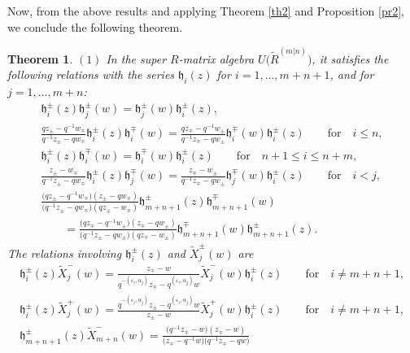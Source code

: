 \documentclass[10pt,a4paper]{amsart}
\numberwithin{equation}{section}
\newtheorem{Theorem}{Theorem}[section]
\begin{document}
Now, from the above results and applying Theorem \ref{th2} and Proposition \ref{pr2}, we conclude the following theorem.
\begin{Theorem}\label{th3}
$(1)$ In the super $R$-matrix algebra $U\bigl(\widetilde{R}^{(m|n)}\bigr)$, it satisfies the following relations with the series $\mathfrak{h}_i(z)$ for $i=1,\dots,m+n+1$, and  for $j=1,\dots,m+n$:
\begin{gather*}%
 \mathfrak{h}_i^{\pm}(z)\mathfrak{h}_j^{\pm}(w)=\mathfrak{h}_j^{\pm}(w)\mathfrak{h}_i^{\pm}(z), \\
 \frac{qz_{\pm}-q^{-1}w_{\mp}}{q^{-1}z_{\pm}-qw_{\mp}}\mathfrak{h}_i^{\pm}(z)\mathfrak{h}_i^{\mp}(w)
 =\frac{qz_{\mp}-q^{-1}w_{\pm}}{q^{-1}z_{\mp}-qw_{\pm}}\mathfrak{h}_i^{\mp}(w)\mathfrak{h}_i^{\pm}(z)\qquad
 \text{for} \quad i\leq n,\\
 \mathfrak{h}_i^{\pm}(z)\mathfrak{h}_i^{\mp}(w)=\mathfrak{h}_i^{\mp}(w)\mathfrak{h}_i^{\pm}(z)\qquad
 \text{for} \quad n+1\leq i\leq n+m,\\
 \frac{z_{\pm}-w_{\mp}}{q^{-1}z_{\pm}-qw_{\mp}}\mathfrak{h}_i^{\pm}(z)\mathfrak{h}_j^{\mp}(w)=\frac{z_{\mp}-w_{\pm}}{q^{-1}z_{\mp}-qw_{\pm}} \mathfrak{h}_j^{\mp}(w)\mathfrak{h}_i^{\pm}(z) \qquad
 \text{for} \quad i<j,
\\
 \frac{\bigl(qz_{\pm}-q^{-1}w_{\mp}\bigr)(z_{\pm}-qw_{\mp})}{\bigl(q^{-1}z_{\pm}-qw_{\mp}\bigr)
 (qz_{\pm}-w_{\mp})} \mathfrak{h}_{m+n+1}^{\pm}(z)\mathfrak{h}_{m+n+1}^{\mp}(w)\\
 \qquad =\frac{\bigl(qz_{\mp}-q^{-1}w_{\pm}\bigr)(z_{\mp}-qw_{\pm})}{\bigl(q^{-1}z_{\pm}-qw_{\pm}\bigr)
 (qz_{\mp}-w_{\pm})}\mathfrak{h}_{m+n+1}^{\mp}(w)\mathfrak{h}_{m+n+1}^{\pm}(z).
\end{gather*}
The relations involving $\mathfrak{h}_i^{\pm}(z)$ and $\widetilde{X}_j^{\pm}(w)$ are
\begin{gather*}%
 \mathfrak{h}_i^{\pm}(z)\widetilde{X}_j^-(w)=\frac{z_{\mp}-w}{q^{-(\varepsilon_i,\alpha_j)}z_{\mp}-q^{(\varepsilon_i, \alpha_j)}w}\widetilde{X}_j^-(w)\mathfrak{h}_i^{\pm}(z)\qquad
 \text{for} \quad i\neq m+n+1,\\
 \mathfrak{h}_i^{\pm}(z)\widetilde{X}_j^+(w)=\frac{q^{-(\varepsilon_i,\alpha_j)}z_{\pm}-q^{(\varepsilon_i,\alpha_j)}w}{z_{\pm}-w}\widetilde{X}_j^+(w) \mathfrak{h}_i^{\pm}(z)\qquad
 \text{for} \quad i\neq m+n+1,\\
 \mathfrak{h}_{m+n+1}^{\pm}(z)\widetilde{X}_{m+n}^-(w)=\frac{\bigl(q^{-1}z_{\mp}-w\bigr)(z_{\mp}-w)}{\bigl(z_{\mp}-q^{-1}w\bigr)\bigl(q^{-1}z_{\mp}-qw\bigr)}

\end{gather*}
\end{Theorem}
\end{document}
